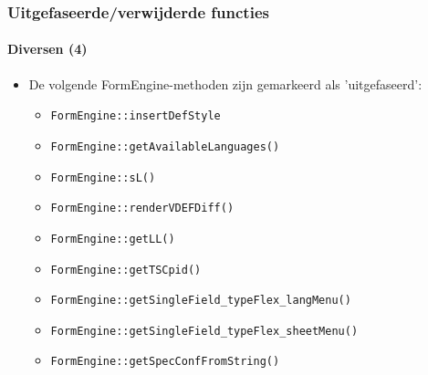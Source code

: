 \begin{frame}[fragile]
	\frametitle{Uitgefaseerde/verwijderde functies}
	\framesubtitle{Diversen (4)}

	\begin{itemize}
		\item De volgende FormEngine-methoden zijn gemarkeerd als 'uitgefaseerd':
		\begin{itemize}
			\item \texttt{FormEngine::insertDefStyle}
			\item \texttt{FormEngine::getAvailableLanguages()}
			\item \texttt{FormEngine::sL()}
			\item \texttt{FormEngine::renderVDEFDiff()}
			\item \texttt{FormEngine::getLL()}
 			\item \texttt{FormEngine::getTSCpid()}
 			\item \texttt{FormEngine::getSingleField\_typeFlex\_langMenu()}
 			\item \texttt{FormEngine::getSingleField\_typeFlex\_sheetMenu()}
 			\item \texttt{FormEngine::getSpecConfFromString()}
 		\end{itemize}
	\end{itemize}

\end{frame}

